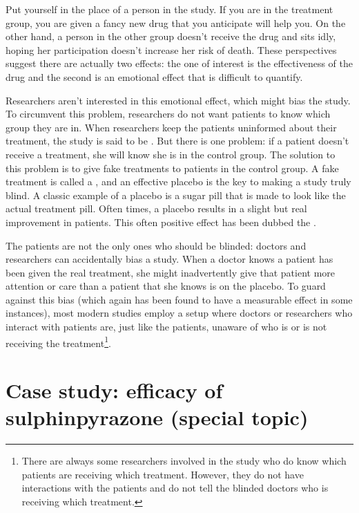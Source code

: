 Put yourself in the place of a person in the study. If you are in the treatment group, you are given a fancy new drug that you anticipate will help you. On the other hand, a person in the other group doesn't receive the drug and sits idly, hoping her participation doesn't increase her risk of death. These perspectives suggest there are actually two effects: the one of interest is the effectiveness of the drug and the second is an emotional effect that is difficult to quantify.

Researchers aren't interested in this emotional effect, which might bias the study. To circumvent this problem, researchers do not want patients to know which group they are in. When researchers keep the patients uninformed about their treatment, the study is said to be . But there is one problem: if a patient doesn't receive a treatment, she will know she is in the control group. The solution to this problem is to give fake treatments to patients in the control group. A fake treatment is called a , and an effective placebo is the key to making a study truly blind. A classic example of a placebo is a sugar pill that is made to look like the actual treatment pill. Often times, a placebo results in a slight but real improvement in patients. This often positive effect has been dubbed the .

The patients are not the only ones who should be blinded: doctors and researchers can accidentally bias a study. When a doctor knows a patient has been given the real treatment, she might inadvertently give that patient more attention or care than a patient that she knows is on the placebo. To guard against this bias (which again has been found to have a measurable effect in some instances), most modern studies employ a  setup where doctors or researchers who interact with patients are, just like the patients, unaware of who is or is not receiving the treatment\footnote{There are always some researchers involved in the study who do know which patients are receiving which treatment. However, they do not have interactions with the patients and do not tell the blinded doctors who is receiving which treatment.}.

\section{Case study: efficacy of sulphinpyrazone (special topic)}
\label{caseStudyOfSulphinpyrazone}


